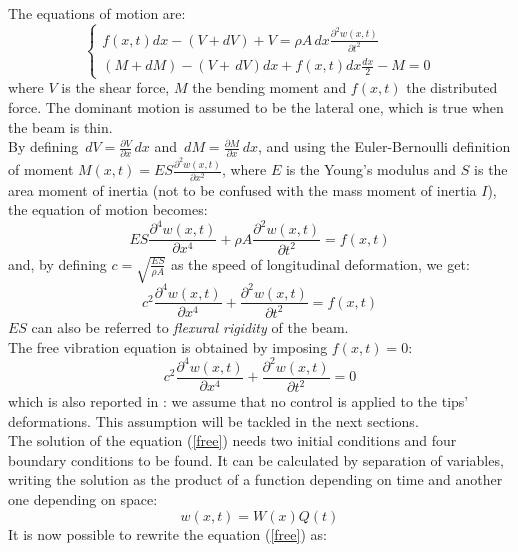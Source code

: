 \documentclass[a4paper,12pt,oneside]{report}
\begin{document}
The equations of motion are:
\begin{equation}
\begin{cases}
f(x,t)dx-(V+dV)+V=\rho A \,dx \frac{\partial^2w(x,t)}{\partial t^2}\\
(M+dM)-(V+\,dV)dx+f(x,t)dx\frac{dx}{2}-M=0
\end{cases}
\end{equation}
where $V$ is the shear force, $M$ the bending moment and $f(x,t)$ the distributed force. The dominant motion is assumed to be the lateral one, which is true when the beam is thin.\\
By defining $\,dV=\frac{\partial V}{\partial x}\,dx$ and $\,dM=\frac{\partial M}{\partial x}\,dx$, and using the Euler-Bernoulli definition of moment $M(x,t)=ES\frac{\partial^2 w(x,t)}{\partial x^2}$, where $E$ is the Young's modulus and $S$ is the area moment of inertia (not to be confused with the mass moment of inertia $I$), the equation of motion becomes:
\begin{equation}
  ES\frac{\partial^4w(x,t)}{\partial x^4}+\rho A\frac{\partial^2w(x,t)}{\partial t^2}=f(x,t)
\end{equation}
and, by defining $c=\sqrt{\frac{ES}{\rho A}}$ as the speed of longitudinal deformation, we get:
\begin{equation}
c^2\frac{\partial^4w(x,t)}{\partial x^4}+\frac{\partial^2w(x,t)}{\partial t^2}=f(x,t)
\label{forced}
\end{equation}
$ES$ can also be referred to \textit{flexural rigidity} of the beam.\\
The free vibration equation is obtained by imposing $f(x,t)=0$:\\
 \begin{equation}
c^2\frac{\partial^4w(x,t)}{\partial x^4}+\frac{\partial^2w(x,t)}{\partial t^2}=0
\label{free}
\end{equation}
which is also reported in \cite{eighteen}: we assume that no control is applied to the tips' deformations. This assumption will be tackled in the next sections.\\
The solution of the equation (\ref{free}) needs two initial conditions and four boundary conditions to be found. It can be calculated by separation of variables, writing the solution as the product of a function depending on time and another one depending on space:
\begin{equation}
w(x,t)=W(x)Q(t)
\label{separability}
\end{equation}
It is now possible to rewrite the equation (\ref{free}) as:
\end{document}
